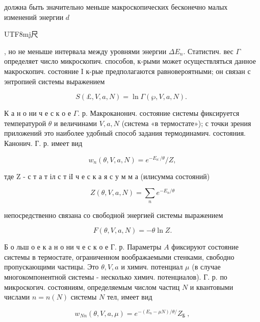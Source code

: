 \documentclass[10pt]{article}
\begin{document}
должна быть значительно меньше макроскопических бесконечно малых изменений энергии $d$ \begin{CJK}{UTF8}{mj}尺\end{CJK}, но не меныше интервала между уровнями энергии $\Delta E_{n}$. Статистич. вес $\Gamma$ определяет число микроскопич. способов, к-рыми может осуществляться данное макроскопич. состояние I к-рые предполагаются равновероятными; он связан с энтропией системы выражением



\[

S(\pounds, V, a, N)=\ln \Gamma(\wp, V, a, N) \text {. }

\]



К а н о ни ч е с к о е $\Gamma$. р. Макроканонич. состояние системы фиксируется температурой $\theta$ и величинами $V, a, N$ (система «в термостате»); с точки зрения приложений это наиболее удобный способ задания термодинамич. состояния. Канонич. Г. р. имеет вид



\[

w_{n}(\theta, V, a, N)=e^{-E_{n^{\prime}} / \theta} / Z,

\]



тде Z - с т а т іл с т іІ ч е с к а я с у м м а (илисумма состояний)



\[

Z(\theta, V, a, N)=\sum_{n} e^{-E_{n} / \theta}

\]



непосредственно связана со свободной энергией системы выражением



\[

F(\theta, V, a, N)=-\theta \ln Z .

\]



Б о льш о е к а н о ни ч е с к о е Г. р. Параметры $A$ фиксируют состояние системы в термостате, ограниченном воображаемыми стенками, свободно пропускающими частицы. Это $\theta, V, a$ и химич. потенциал $\mu$ (в случае многокомпонентной системы - несколько химич. потенциалов). Г. р. по микроскогич. состояниям, определяемым числом частиц $N$ и квантовыми числами $n=n(N)$ системы $N$ тел, имеет вид



\[

w_{N n}(\theta, V, a, \mu)=e^{-\left(E_{n}-\mu N\right) / \theta /} Z_{\text {Б }},

\]
\end{document}
